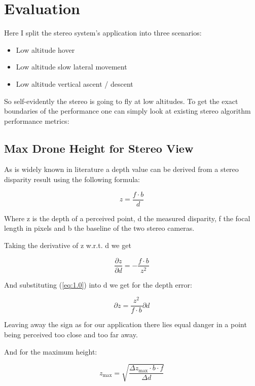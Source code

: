 \chapter*{Evaluation}

Here I split the stereo system's application into three scenarios:
\begin{itemize}
    \item Low altitude hover
    \item Low altitude slow lateral movement
    \item Low altitude vertical ascent / descent
\end{itemize}

So self-evidently the stereo is going to fly at low altitudes. To get the exact boundaries of the performance one can simply look at existing stereo algorithm performance metrics:

\section{Max Drone Height for Stereo View}
As is widely known in literature a depth value can be derived from a stereo disparity result using the following formula:

\begin{equation}\label{eq:1.0}
    z = \frac{f \cdot b}{d}
\end{equation}

Where z is the depth of a perceived point, d the measured disparity, f the focal length in pixels and b the baseline of the two stereo cameras.

Taking the derivative of z w.r.t. d we get

\begin{equation}
    \frac{\partial z}{\partial d} = - \frac{f  \cdot b}{z^2}
\end{equation}

And substituting (\ref{eq:1.0}) into d we get for the depth error:

\begin{equation}
    {\partial z} = \frac{z^2}{f  \cdot b}\partial d
\end{equation}

Leaving away the sign as for our application there lies equal danger in a point being perceived too close and too far away.

And for the maximum height:

\begin{equation}
    z_{\text{max}} = \sqrt{\frac{\Delta z_{\text{max}} \cdot b \cdot f}{\Delta d}}
\end{equation}


